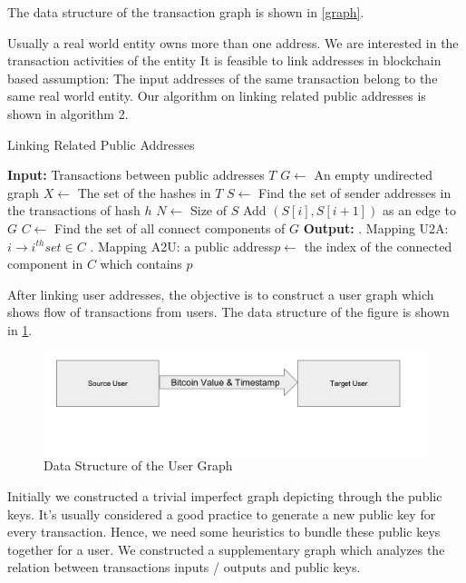 \documentclass[runningheads,a4paper]{llncs}[2017/09/04]
\begin{document}
The data structure of the transaction graph is shown in \ref{graph}.

Usually a real world entity owns more than one address. We are interested in the transaction activities of the entity It is feasible to link addresses in blockchain based assumption:
The input addresses of the same transaction belong to the same real world entity.
Our algorithm on linking related public addresses is shown in algorithm 2.

\begin{algorithm}[!h]
	\caption{Linking Related Public Addresses}
	\begin{algorithmic}
		\State \textbf{Input: } Transactions between public addresses $T$
		\State $G \gets$ An empty undirected graph
		\State $X \gets$ The set of the hashes in $T$
		\State $S \gets$ Find the set of sender addresses in the transactions of hash $h$
		\State $N \gets$ Size of $S$
		\State Add $(S[i], S[i+1])$ as an edge to $G$
		\EndFor
		\EndFor
		\State $C \gets$ Find the set of all connect components of $G$
		\State \textbf{Output: } 
		. Mapping U2A: $i \rightarrow i^{th} set \in C$
		. Mapping A2U: a public address$ p \gets$ the index of the connected component in $C$ which contains $p$
	\end{algorithmic}
\end{algorithm}

After linking user addresses, the objective is to construct a user graph which shows flow of transactions from users. 
The data structure of the figure is shown in \ref{trans}.

\begin{figure}[!htb]
	\centering 
	\includegraphics[width=0.8\columnwidth]{trans} 
	\caption{Data Structure of the User Graph} %
	\label{trans}
\end{figure}

Initially we constructed a trivial imperfect graph depicting through the public keys.
It’s usually considered a good practice to generate a new public key for every transaction.
Hence, we need some heuristics to bundle these public keys together for a user.
We constructed a supplementary graph which analyzes the relation between transactions inputs / outputs and public keys.
\end{document}
